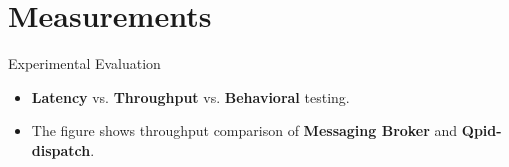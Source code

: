 \documentclass[hyperref={pdfpagelabels=false, unicode},pdf,slideColor,fyma,9pt]{beamer}
\begin{document}
    \section{Measurements}
    \begin{frame}{Experimental Evaluation}
      \begin{itemize}
          \setlength\itemsep{0.5em}
          \item \textbf{Latency} vs. \textbf{Throughput} vs. \textbf{Behavioral} testing.
          \item The figure shows throughput comparison of \textbf{Messaging Broker} and \textbf{Qpid-dispatch}.
      \end{itemize}
      \begin{figure}[ht]
        \begin{center}
        \end{center}
      \end{figure}
    \end{frame}
\end{document}
